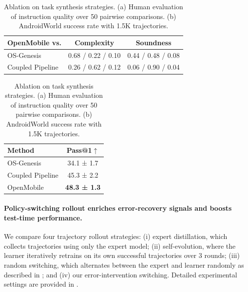 \documentclass{article} %
\begin{document}
\begin{table}[t]
\centering
\footnotesize
\setlength{\tabcolsep}{4pt}
\renewcommand{\arraystretch}{1.05}
\begin{minipage}[t]{0.58\textwidth}
\centering
\begin{tabular}{lcc}
\toprule
\textbf{OpenMobile vs.} & \textbf{Complexity} & \textbf{Soundness} \\
\midrule
OS-Genesis & 0.68 / 0.22 / 0.10 & 0.44 / 0.48 / 0.08 \\
Coupled Pipeline & 0.26 / 0.62 / 0.12 & 0.06 / 0.90 / 0.04 \\
\bottomrule
\end{tabular}
\label{tab:ablation_task_human}
\end{minipage}
\hfill
\begin{minipage}[t]{0.38\textwidth}
\centering
\begin{tabular}{lc}
\toprule
\textbf{Method} & \textbf{Pass@1$\uparrow$} \\
\midrule
OS-Genesis & 34.1 ± 1.7 \\
Coupled Pipeline & 45.3 ± 2.2 \\
OpenMobile & \textbf{48.3 ± 1.3} \\
\bottomrule
\end{tabular}
\label{tab:ablation_task_sr}
\end{minipage}
\vspace{-0.15cm}
\caption{Ablation on task synthesis strategies. (a) Human evaluation of instruction quality over 50 pairwise comparisons. (b) AndroidWorld success rate with 1.5K trajectories.}
\vspace{-0.15cm}
\label{tab:ablation_task_synthesis}
\end{table}

\paragraph{Policy-switching rollout enriches error-recovery signals and boosts test-time performance.}
We compare four trajectory rollout strategies: (i) expert distillation, which collects trajectories
using only the expert model; (ii) self-evolution, where the learner iteratively retrains on its own successful trajectories over 3 rounds; (iii) random switching, which alternates between the expert and learner randomly as described in ; and (iv) our error-intervention switching.
Detailed experimental settings are provided in .
\end{document}
